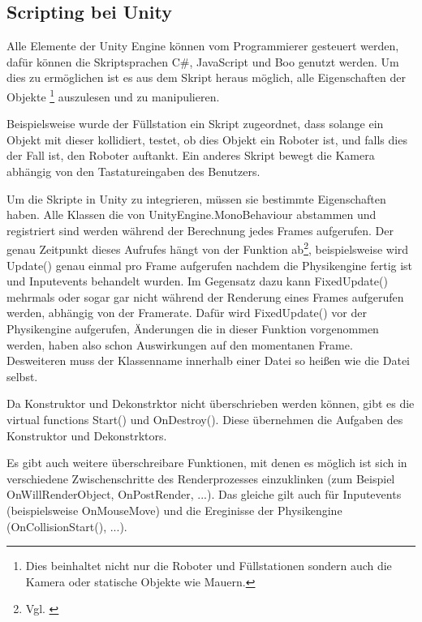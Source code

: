 \subsection{Scripting bei Unity}
Alle Elemente der Unity Engine k{\"{o}}nnen vom Programmierer gesteuert werden, daf{\"{u}}r k{\"{o}}nnen
die Skriptsprachen C\#, JavaScript und Boo genutzt werden.\cite{wiki:unity}
Um dies zu erm{\"{o}}glichen ist es aus dem Skript heraus m{\"{o}}glich, alle Eigenschaften
der Objekte \footnote{Dies beinhaltet nicht nur die Roboter und F{\"{u}}llstationen sondern auch die Kamera
oder statische Objekte wie Mauern.} auszulesen und zu manipulieren.

Beispielsweise wurde der F{\"{u}}llstation ein Skript zugeordnet, dass solange ein Objekt mit dieser kollidiert, testet, ob dies Objekt ein Roboter ist, und falls dies der Fall ist,
den Roboter auftankt. Ein anderes Skript bewegt die Kamera abh{\"{a}}ngig von den Tastatureingaben des Benutzers.

Um die Skripte in Unity zu integrieren, m{\"{u}}ssen sie bestimmte Eigenschaften haben. Alle Klassen die von UnityEngine.MonoBehaviour
abstammen und registriert sind werden w{\"{a}}hrend der Berechnung jedes Frames aufgerufen. Der genau Zeitpunkt dieses Aufrufes h{\"{a}}ngt von
der Funktion ab\footnote{Vgl. \cite{unity-exec-order}}, beispielsweise wird Update() genau einmal pro Frame aufgerufen nachdem die Physikengine fertig ist
und Inputevents behandelt wurden. Im Gegensatz dazu kann FixedUpdate() mehrmals oder sogar gar nicht w{\"{a}}hrend der Renderung eines Frames aufgerufen
werden, abh{\"{a}}ngig von der Framerate. Daf{\"{u}}r wird FixedUpdate() vor der Physikengine aufgerufen, {\"{A}}nderungen die in dieser
Funktion vorgenommen werden, haben also schon Auswirkungen auf den momentanen Frame. Desweiteren muss der Klassenname innerhalb einer Datei so
hei{\ss}en wie die Datei selbst.

Da Konstruktor und Dekonstrktor nicht {\"{u}}berschrieben werden k{\"{o}}nnen, gibt es die virtual functions Start() und OnDestroy(). Diese
{\"{u}}bernehmen die Aufgaben des Konstruktor und Dekonstrktors.

Es gibt auch weitere {\"{u}}berschreibare Funktionen, mit denen es m{\"{o}}glich ist sich in verschiedene Zwischenschritte des Renderprozesses
einzuklinken (zum Beispiel OnWillRenderObject, OnPostRender, ...). Das gleiche gilt auch f{\"{u}}r Inputevents (beispielsweise OnMouseMove) und
die Ereginisse der Physikengine (OnCollisionStart(), ...).


\clearpage
